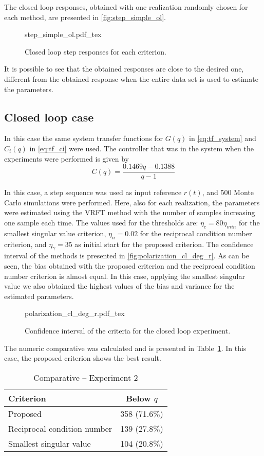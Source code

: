 The closed loop responses, obtained with one realization randomly chosen for each method, are presented in \autoref{fig:step_simple_ol}.
\begin{figure}[h!]
  \centering
  \def\svgwidth{\columnwidth}
  {\footnotesize{step_simple_ol.pdf_tex}}
  \caption{\label{fig:step_simple_ol} Closed loop step responses for each criterion.}
\end{figure}
It is possible to see that the obtained responses are close to the desired one, different from the obtained response when the entire data set is used to estimate the parameters.


\subsection{Closed loop case}
In this case the same system transfer functions for $G(q)$ in \eqref{eq:tf_system} and $C_i(q)$ in \eqref{eq:tf_ci} were used.
The controller that was in the system when the experiments were performed is given by
\begin{equation*}
	C(q) = \frac{0.1469q - 0.1388}{q-1}
\end{equation*}

In this case, a step sequence was used as input reference $r(t)$, and 500 Monte Carlo simulations were performed.
Here, also for each realization, the parameters were estimated using the VRFT method with the number of samples increasing one sample each time.
The values used for the thresholds are: $\eta_c = 80\eta_{min} $ for the smallest singular value criterion, $\eta_n = 0.02$ for the reciprocal condition number criterion, and $\eta_\gamma = 35$ as initial start for the proposed criterion.
The confidence interval of the methods is presented in \autoref{fig:polarization_cl_deg_r}.
As can be seen, the bias obtained with the proposed criterion and the reciprocal condition number criterion is almost equal.
In this case, applying the smallest singular value we also obtained the highest values of the bias and variance for the estimated parameters.
\begin{figure}[h!]
  \centering
  \def\svgwidth{\columnwidth}
  {\footnotesize{polarization_cl_deg_r.pdf_tex}}
  \caption{\label{fig:polarization_cl_deg_r} Confidence interval of the criteria for the closed loop experiment.}
\end{figure}

The numeric comparative was calculated and is presented in Table~\ref{tab:comp_cl_deg_r}.
In this case, the proposed criterion shows the best result.
\begin{table}[h!]
\caption{Comparative -- Experiment 2 \label{tab:comp_cl_deg_r}}
\centering
\begin{tabular}{lc}
\toprule
Criterion & Below $q$\\
\midrule
Proposed & 358 (71.6\%) \\
Reciprocal condition number & 139 (27.8\%) \\
Smallest singular value & 104 (20.8\%) \\
\bottomrule
\end{tabular}
\end{table}

